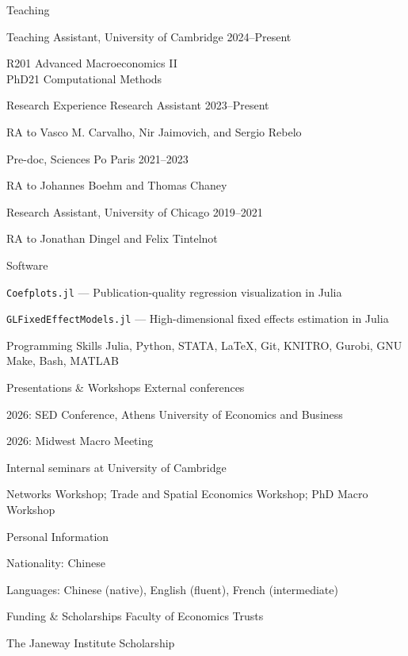 \documentclass{resume}
\begin{document}
\begin{rSection}{Teaching}

Teaching Assistant, University of Cambridge \hfill 2024–Present
\begin{rItemize}
    \item R201 Advanced Macroeconomics II \\
    PhD21 Computational Methods
\end{rItemize}
\end{rSection}

\begin{rSection}{Research Experience}
Research Assistant \hfill 2023–Present
\begin{rItemize}
    \item RA to Vasco M. Carvalho, Nir Jaimovich, and Sergio Rebelo
\end{rItemize}
Pre-doc, Sciences Po Paris \hfill 2021–2023
\begin{rItemize}
    \item RA to Johannes Boehm and Thomas Chaney
\end{rItemize}
Research Assistant, University of Chicago \hfill 2019–2021
\begin{rItemize}
    \item RA to Jonathan Dingel and Felix Tintelnot
\end{rItemize}


\end{rSection}

\begin{rSection}{Software}

\texttt{Coefplots.jl} — Publication-quality regression visualization in Julia

\texttt{GLFixedEffectModels.jl} — High-dimensional fixed effects estimation in Julia

\end{rSection}

\begin{rSection}{Programming Skills}
Julia, Python, STATA, \LaTeX, Git, KNITRO, Gurobi, GNU Make, Bash, MATLAB
\end{rSection}

\begin{rSection}{Presentations \& Workshops}
External conferences
\begin{rItemize}
    \item 2026: SED Conference, Athens University of Economics and Business
    \item 2026: Midwest Macro Meeting
\end{rItemize}
Internal seminars at University of Cambridge
\begin{rItemize}
    \item Networks Workshop; Trade and Spatial Economics Workshop; PhD Macro Workshop
\end{rItemize}

\end{rSection}
\begin{rSection}{Personal Information}

Nationality: Chinese

Languages: Chinese (native), English (fluent), French (intermediate)
\end{rSection}

\begin{rSection}{Funding \& Scholarships}
Faculty of Economics Trusts

The Janeway Institute Scholarship
\end{rSection}
\end{document}
